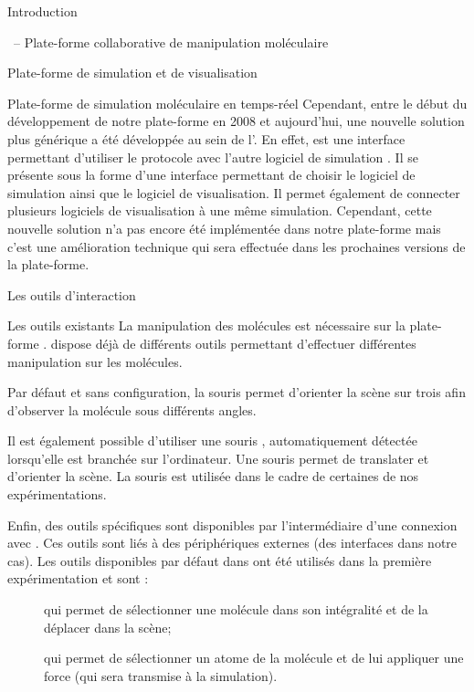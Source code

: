 \documentclass[myfrancais]{mythesis}
\begin{document}
\begin{mypart}{Introduction}
\begin{mychapter}{\myShaddock\ -- Plate-forme collaborative de manipulation moléculaire}
\begin{mysection}{Plate-forme de simulation et de visualisation}
\begin{mysubsection}{Plate-forme de simulation moléculaire en temps-réel}
					Cependant, entre le début du développement de notre plate-forme en 2008 et aujourd'hui, une nouvelle solution plus générique a été développée au sein de l'.
					En effet, \myMDDriver {} est une interface permettant d'utiliser le protocole  avec l'autre logiciel de simulation \myGromacs.
					Il se présente sous la forme d'une interface permettant de choisir le logiciel de simulation ainsi que le logiciel de visualisation.
					Il permet également de connecter plusieurs logiciels de visualisation à une même simulation.
					Cependant, cette nouvelle solution n'a pas encore été implémentée dans notre plate-forme mais c'est une amélioration technique qui sera effectuée dans les prochaines versions de la plate-forme.
				\end{mysubsection}
			\end{mysection}
			\begin{mysection}{Les outils d'interaction}
				\begin{mysubsection}{Les outils existants}
					La manipulation des molécules est nécessaire sur la plate-forme \myShaddock.
					 dispose déjà de différents outils permettant d'effectuer différentes manipulation sur les molécules.

					Par défaut et sans configuration, la souris permet d'orienter la scène sur trois  afin d'observer la molécule sous différents angles.

					Il est également possible d'utiliser une souris \myThreeD, automatiquement détectée lorsqu'elle est branchée sur l'ordinateur.
					Une souris \myThreeD permet de translater et d'orienter la scène.
					La souris \myThreeD \mySpaceNavigator est utilisée dans le cadre de certaines de nos expérimentations.

					Enfin, des outils spécifiques sont disponibles par l'intermédiaire d'une connexion avec  .
					Ces outils sont liés à des périphériques externes (des interfaces \myOmni dans notre cas).
					Les outils disponibles par défaut dans  ont été utilisés dans la première expérimentation  et sont :
					\begin{description}
						\item[] qui permet de sélectionner une molécule dans son intégralité et de la déplacer dans la scène;
						\item[] qui permet de sélectionner un atome de la molécule et de lui appliquer une force (qui sera transmise à la simulation).
					\end{description}


\end{mysubsection}
\end{mysection}
\end{mychapter}
\end{mypart}
\end{document}
